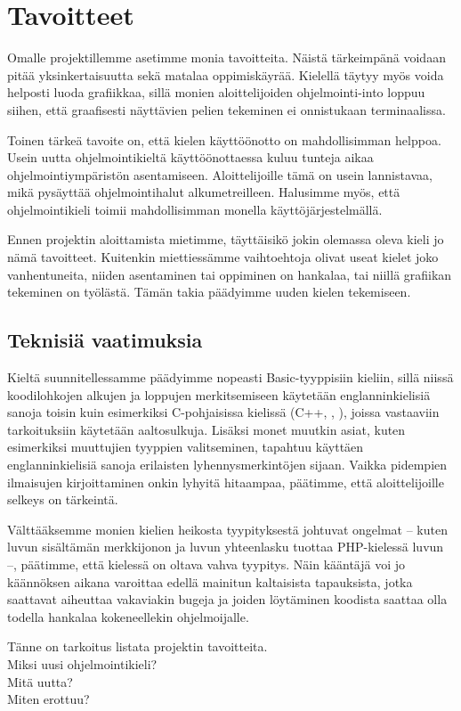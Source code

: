 \section{Tavoitteet}
Omalle projektillemme asetimme monia tavoitteita.
Näistä tärkeimpänä voidaan pitää yksinkertaisuutta
sekä matalaa oppimiskäyrää.
Kielellä täytyy myös voida helposti luoda grafiikkaa,
sillä monien aloittelijoiden ohjelmointi-into loppuu siihen,
että graafisesti näyttävien pelien tekeminen ei onnistukaan terminaalissa.

Toinen tärkeä tavoite on,
että kielen käyttöönotto on mahdollisimman helppoa.
Usein uutta ohjelmointikieltä käyttöönottaessa
kuluu tunteja aikaa ohjelmointiympäristön asentamiseen.
Aloittelijoille tämä on usein lannistavaa,
mikä pysäyttää ohjelmointihalut alkumetreilleen.
Halusimme myös, että ohjelmointikieli toimii mahdollisimman monella käyttöjärjestelmällä.

Ennen projektin aloittamista mietimme,
täyttäisikö jokin olemassa oleva kieli jo nämä tavoitteet.
Kuitenkin miettiessämme vaihtoehtoja
olivat useat kielet joko vanhentuneita,
niiden asentaminen tai oppiminen on hankalaa,
tai niillä grafiikan tekeminen on työlästä.
Tämän takia päädyimme uuden kielen tekemiseen.

\subsection{Teknisiä vaatimuksia}
Kieltä suunnitellessamme päädyimme nopeasti Basic-tyyppisiin kieliin,
sillä niissä koodilohkojen alkujen ja loppujen merkitsemiseen käytetään englanninkielisiä sanoja
toisin kuin esimerkiksi C-pohjaisissa kielissä (C++, , ),
joissa vastaaviin tarkoituksiin käytetään aaltosulkuja.
Lisäksi monet muutkin asiat,
kuten esimerkiksi muuttujien tyyppien valitseminen,
tapahtuu käyttäen englanninkielisiä sanoja erilaisten lyhennysmerkintöjen sijaan.
Vaikka pidempien ilmaisujen kirjoittaminen onkin lyhyitä hitaampaa,
päätimme, että aloittelijoille selkeys on tärkeintä.

Välttääksemme monien kielien heikosta tyypityksestä johtuvat ongelmat
-- kuten luvun sisältämän merkkijonon ja luvun yhteenlasku tuottaa PHP-kielessä luvun  --,
päätimme, että kielessä on oltava vahva tyypitys.
Näin kääntäjä voi jo käännöksen aikana varoittaa edellä mainitun kaltaisista tapauksista,
jotka saattavat aiheuttaa vakaviakin bugeja ja
joiden löytäminen koodista saattaa olla todella hankalaa kokeneellekin ohjelmoijalle.

\begin{comment}
Usein uutta ohjelmointikieltä käyttöönottaessani
minulla kuluu enemmän aikaa ohjelmointiympäristön asentamiseen
kuin uuden kielen oppimiseen.
Vaikka tämä ongelma ei suoranaisesti
\end{comment}

\begin{anfxnote}{}
Tänne on tarkoitus listata projektin tavoitteita.
\\
Miksi uusi ohjelmointikieli?
\\
Mitä uutta?
\\
Miten erottuu?
\end{anfxnote}